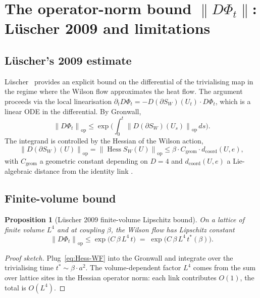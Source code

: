 \documentclass[11pt,a4paper]{amsart}
\newtheorem{proposition}[theorem]{Proposition}
\theoremstyle{definition}
\newcommand{\norm}[1]{\left\lVert#1\right\rVert}
\DeclareMathOperator{\Hess}{Hess}
\begin{document}
\section{The operator-norm bound $\norm{D\Phi_t}$: L\"uscher 2009 and
limitations}\label{sec:bound}

\subsection{L\"uscher's 2009 estimate}
L\"uscher~\cite{Luscher2009TrivializingMaps} provides an explicit bound
on the differential of the trivialising map in the regime where the
Wilson flow approximates the heat flow. The argument proceeds via the
local linearisation
$\partial_t D\Phi_t = -D(\partial S_W)(U_t) \cdot D\Phi_t$,
which is a linear ODE in the differential. By Gronwall,
$$
\norm{D\Phi_t}_\mathrm{op} \leq \exp\bigl(\int_0^t \norm{D(\partial S_W)(U_s)}_\mathrm{op}\,ds\bigr).
$$
The integrand is controlled by the Hessian of the Wilson action,
\begin{equation}\label{eq:Hess-WF}
\norm{D(\partial S_W)(U)}_\mathrm{op} = \norm{\Hess S_W(U)}_\mathrm{op}
\leq \beta\cdot C_\mathrm{geom}\cdot d_\mathrm{coord}(U,e),
\end{equation}
with $C_\mathrm{geom}$ a geometric constant depending on $D = 4$ and
$d_\mathrm{coord}(U,e)$ a Lie-algebraic distance from the identity link
\cite[Eq.~(2.7)]{Luscher2009TrivializingMaps}.

\subsection{Finite-volume bound}
\begin{proposition}[L\"uscher 2009 finite-volume Lipschitz bound]
\label{prop:Luscher-finvol}
On a lattice of finite volume $L^4$ and at coupling $\beta$, the Wilson
flow has Lipschitz constant
$$
\norm{D\Phi_t}_\mathrm{op} \leq \exp\bigl(C\,\beta\,L^4\,t\bigr)
\;=\;\exp\bigl(C\,\beta\,L^4\,t^*(\beta)\bigr).
$$
\end{proposition}
\begin{proof}[Proof sketch]
Plug~\eqref{eq:Hess-WF} into the Gronwall and integrate over the
trivialising time $t^* \sim \beta\cdot a^2$. The volume-dependent factor
$L^4$ comes from the sum over lattice sites in the Hessian operator
norm: each link contributes $O(1)$, the total is $O(L^4)$.
\end{proof}
\end{document}
